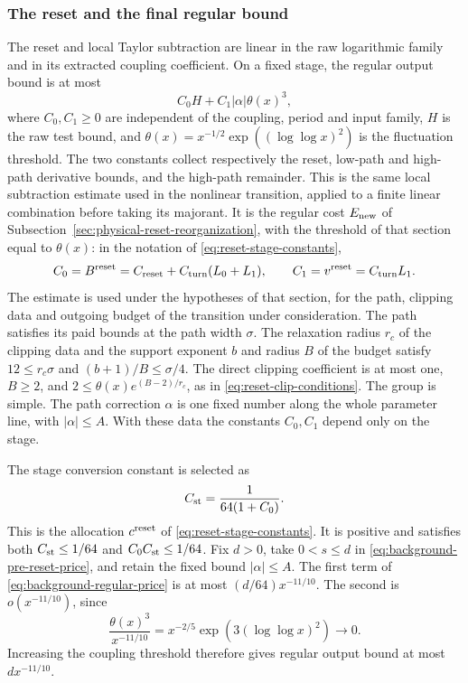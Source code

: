 \subsubsection{The reset and the final regular bound}
The reset and local Taylor subtraction are linear in the raw
logarithmic family and in its extracted coupling coefficient.
On a fixed stage, the regular output bound is at most
\begin{equation}\label{eq:background-regular-price}
                   C_0 H+C_1|\alpha|\theta(x)^3,
\end{equation}
where $C_0,C_1\ge0$ are independent of the coupling, period and
input family, $H$ is the raw test bound, and
$\theta(x)=x^{-1/2}\exp((\log\log x)^2)$ is the fluctuation
threshold. The two constants collect respectively the reset,
low-path and high-path derivative bounds, and the high-path
remainder. This is the same local subtraction estimate used in
the nonlinear transition, applied to a finite linear combination
before taking its majorant. It is the regular cost $E_{\rm new}$ of
Subsection~\ref{sec:physical-reset-reorganization}, with the threshold
of that section equal to $\theta(x)$: in the notation of
\eqref{eq:reset-stage-constants},
\[
 C_0=B^{\rm reset}=C_{\rm reset}+C_{\rm turn}(L_0+L_1),\qquad
 C_1=v^{\rm reset}=C_{\rm turn}L_1.
\]
The estimate is used under the hypotheses of that section, for the
path, clipping data and outgoing budget of the transition under
consideration. The path satisfies its paid bounds at the path width
$\sigma$. The relaxation radius $r_c$ of the clipping data and the
support exponent $b$ and radius $B$ of the budget satisfy
$12\le r_c\sigma$ and $(b+1)/B\le\sigma/4$. The direct clipping
coefficient is at most one, $B\ge2$, and
$2\le\theta(x)e^{(B-2)/r_c}$, as in \eqref{eq:reset-clip-conditions}.
The group is simple. The path correction $\alpha$ is one fixed number along the
whole parameter line, with $|\alpha|\le A$. With these data the
constants $C_0,C_1$ depend only on the stage.

The stage conversion constant is selected as
\[
                 C_{\rm st}=\frac1{64(1+C_0)}.
\]
This is the allocation $c^{\rm reset}$ of
\eqref{eq:reset-stage-constants}.
It is positive and satisfies both $C_{\rm st}\le1/64$ and
$C_0C_{\rm st}\le1/64$. Fix $d>0$, take $0<s\le d$ in
\eqref{eq:background-pre-reset-price}, and retain the fixed
bound $|\alpha|\le A$. The first term of
\eqref{eq:background-regular-price} is at most
$(d/64)x^{-11/10}$. The second is $o(x^{-11/10})$, since
\[
 \frac{\theta(x)^3}{x^{-11/10}}
          =x^{-2/5}\exp(3(\log\log x)^2)\longrightarrow0.
\]
Increasing the coupling threshold therefore gives regular
output bound at most $d x^{-11/10}$.


